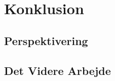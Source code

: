 \chapter{Konklusion}


\section{Perspektivering}

\section{Det Videre Arbejde}
\label{VidereArbejde}
